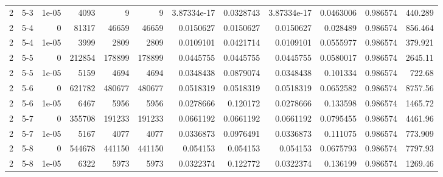 \begin{tabular}{rlrrrrrrrrrr}
     2 & 5-3    &      1e-05 &        4093 &                 9 &                 9 &     3.87334e-17 &     0.0328743   &      3.87334e-17 &        0.0463006 &               0.986574 &          440.289   \\
     2 & 5-4    &      0     &       81317 &             46659 &             46659 &     0.0150627   &     0.0150627   &      0.0150627   &        0.028489  &               0.986574 &          856.464   \\
     2 & 5-4    &      1e-05 &        3999 &              2809 &              2809 &     0.0109101   &     0.0421714   &      0.0109101   &        0.0555977 &               0.986574 &          379.921   \\
     2 & 5-5    &      0     &      212854 &            178899 &            178899 &     0.0445755   &     0.0445755   &      0.0445755   &        0.0580017 &               0.986574 &         2645.11    \\
     2 & 5-5    &      1e-05 &        5159 &              4694 &              4694 &     0.0348438   &     0.0879074   &      0.0348438   &        0.101334  &               0.986574 &          722.68    \\
     2 & 5-6    &      0     &      621782 &            480677 &            480677 &     0.0518319   &     0.0518319   &      0.0518319   &        0.0652582 &               0.986574 &         8757.56    \\
     2 & 5-6    &      1e-05 &        6467 &              5956 &              5956 &     0.0278666   &     0.120172    &      0.0278666   &        0.133598  &               0.986574 &         1465.72    \\
     2 & 5-7    &      0     &      355708 &            191233 &            191233 &     0.0661192   &     0.0661192   &      0.0661192   &        0.0795455 &               0.986574 &         4461.96    \\
     2 & 5-7    &      1e-05 &        5167 &              4077 &              4077 &     0.0336873   &     0.0976491   &      0.0336873   &        0.111075  &               0.986574 &          773.909   \\
     2 & 5-8    &      0     &      544678 &            441150 &            441150 &     0.054153    &     0.054153    &      0.054153    &        0.0675793 &               0.986574 &         7797.93    \\
     2 & 5-8    &      1e-05 &        6322 &              5973 &              5973 &     0.0322374   &     0.122772    &      0.0322374   &        0.136199  &               0.986574 &         1269.46    \\

\end{tabular}
